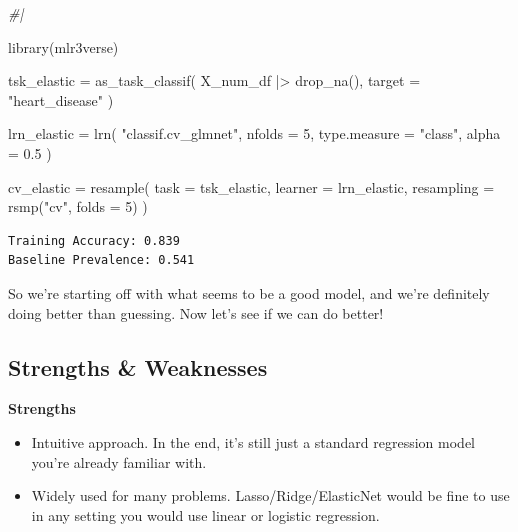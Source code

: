 \documentclass[
  letterpaper,
]{krantz}
\newenvironment{Shaded}{}{}
\newcommand{\AttributeTok}[1]{\textcolor[rgb]{0.49,0.56,0.16}{#1}}
\newcommand{\CommentTok}[1]{\textcolor[rgb]{0.38,0.63,0.69}{\textit{#1}}}
\newcommand{\DecValTok}[1]{\textcolor[rgb]{0.25,0.63,0.44}{#1}}
\newcommand{\FloatTok}[1]{\textcolor[rgb]{0.25,0.63,0.44}{#1}}
\newcommand{\FunctionTok}[1]{\textcolor[rgb]{0.02,0.16,0.49}{#1}}
\newcommand{\NormalTok}[1]{#1}
\newcommand{\OtherTok}[1]{\textcolor[rgb]{0.00,0.44,0.13}{#1}}
\newcommand{\SpecialCharTok}[1]{\textcolor[rgb]{0.25,0.44,0.63}{#1}}
\newcommand{\StringTok}[1]{\textcolor[rgb]{0.25,0.44,0.63}{#1}}
\providecommand{\tightlist}{%
  \setlength{\itemsep}{0pt}\setlength{\parskip}{0pt}}\usepackage{longtable,booktabs,array}
\begin{document}
\begin{Shaded}
\begin{Highlighting}[]
\CommentTok{\#|}

\FunctionTok{library}\NormalTok{(mlr3verse)}

\NormalTok{tsk\_elastic }\OtherTok{=} \FunctionTok{as\_task\_classif}\NormalTok{(}
\NormalTok{    X\_num\_df }\SpecialCharTok{|\textgreater{}} \FunctionTok{drop\_na}\NormalTok{(),}
    \AttributeTok{target =} \StringTok{"heart\_disease"}
\NormalTok{)}

\NormalTok{lrn\_elastic }\OtherTok{=} \FunctionTok{lrn}\NormalTok{(}
    \StringTok{"classif.cv\_glmnet"}\NormalTok{, }
    \AttributeTok{nfolds =} \DecValTok{5}\NormalTok{, }
    \AttributeTok{type.measure =} \StringTok{"class"}\NormalTok{, }
    \AttributeTok{alpha =} \FloatTok{0.5}
\NormalTok{)}

\NormalTok{cv\_elastic }\OtherTok{=} \FunctionTok{resample}\NormalTok{(}
    \AttributeTok{task       =}\NormalTok{ tsk\_elastic,}
    \AttributeTok{learner    =}\NormalTok{ lrn\_elastic,}
    \AttributeTok{resampling =} \FunctionTok{rsmp}\NormalTok{(}\StringTok{"cv"}\NormalTok{, }\AttributeTok{folds =} \DecValTok{5}\NormalTok{)}
\NormalTok{)}
\end{Highlighting}
\end{Shaded}

\begin{verbatim}
Training Accuracy: 0.839
Baseline Prevalence: 0.541
\end{verbatim}

So we're starting off with what seems to be a good model, and we're
definitely doing better than guessing. Now let's see if we can do
better!

\subsection{Strengths \& Weaknesses}\label{strengths-weaknesses}

\textbf{Strengths}

\begin{itemize}
\tightlist
\item
  Intuitive approach. In the end, it's still just a standard regression
  model you're already familiar with.
\item
  Widely used for many problems. Lasso/Ridge/ElasticNet would be fine to
  use in any setting you would use linear or logistic regression.
\end{itemize}
\end{document}

